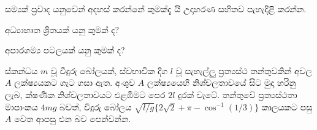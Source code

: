 \documentclass[12pt]{exam}
\begin{document}
\begin{questions}
\begin{solutionbox}{2in}
\end{solutionbox}

\question[20]
සම්‍යක් ප්‍රවාද යනුවෙන් අදහස් කරන්නේ කුමක්දැ යි උදාහරණ සහිතව පැහැදිළි කරන්න.
\makeemptybox{\fill}

\newpage

\question[20]
අධ්‍යාහෘත ශ්‍රිතයක් යනු කුමක් ද?
\fillwithlines{\fill}

\newpage

\question[20]
අපාරගම්‍ය පටලයක් යනු කුමක් ද?
\fillwithdottedlines{8em}

\question[10]
ස්කන්ධය $m$ වූ වීදුරු බෝලයක්, ස්වභාවික දිග $l$ වූ සැහැල්ලු ප්‍රත්‍යස්ථ තන්තුවකින් අචල
$A$ ලක්ෂ්‍යයකට ගැට ගසා ඇත. අංශුව $A$ ලක්ෂ්‍යයෙහි නිශ්චලතාවයේ සිට මුදා හරිනු
ලැබ, ක්ෂණික නිශ්චලතාවයට එළඹීමට පෙර $2l$ දුරක් වැටේ. තන්තුවේ ප්‍රත්‍යස්ථතා මාපාංකය
$4mg$ බවත්, වීදුරු බෝලය $\sqrt{l/g}\{2\sqrt2+\pi -\cos^{-1}(1/3)\}$ කාලයකට පසු 
$A$ වෙත ආපසු එන බව පෙන්වන්න.

\end{questions}
\end{document}
